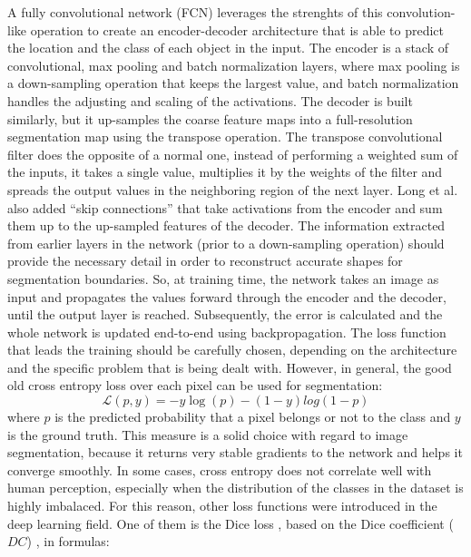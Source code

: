 \noindent A fully convolutional network (FCN) leverages the strenghts of this convolution-like operation to create an encoder-decoder architecture that is able to predict the location and the class of each object in the input. The encoder is a stack of convolutional, max pooling and batch normalization layers, where max pooling is a down-sampling operation that keeps the largest value, and batch normalization \cite{ioffe2015batch} handles the adjusting and scaling of the activations. The decoder is built similarly, but it up-samples the coarse feature maps into a full-resolution segmentation map using the transpose operation. The transpose convolutional filter does the opposite of a normal one, instead of performing a weighted sum of the inputs, it takes a single value, multiplies it by the weights of the filter and spreads the output values in the neighboring region of the next layer.
\bigbreak
\noindent Long et al. also added ``skip connections'' that take activations from the encoder and sum them up to the up-sampled features of the decoder. The information extracted from earlier layers in the network (prior to a down-sampling operation) should provide the necessary detail in order to reconstruct accurate shapes for segmentation boundaries.
\bigbreak
\noindent So, at training time, the network takes an image as input and propagates the values forward through the encoder and the decoder, until the output layer is reached. Subsequently, the error is calculated and the whole network is updated end-to-end using backpropagation. The loss function that leads the training should be carefully chosen, depending on the architecture and the specific problem that is being dealt with. However, in general, the good old cross entropy loss over each pixel can be used for segmentation:
\begin{equation}
\mathcal{L}(p, y) = -y\log(p)-(1-y)log(1-p)
\end{equation}
where $p$ is the predicted probability that a pixel belongs or not to the class and $y$ is the ground truth. This measure is a solid choice with regard to image segmentation, because it returns very stable gradients to the network and helps it converge smoothly.
\bigbreak
\noindent In some cases, cross entropy does not correlate well with human perception, especially when the distribution of the classes in the dataset is highly imbalaced. For this reason, other loss functions were introduced in the deep learning field. One of them is the Dice loss \cite{sudre2017generalised}, based on the Dice coefficient ($DC$) \cite{sorensen1948method}\cite{dice1945measures}, in formulas:
